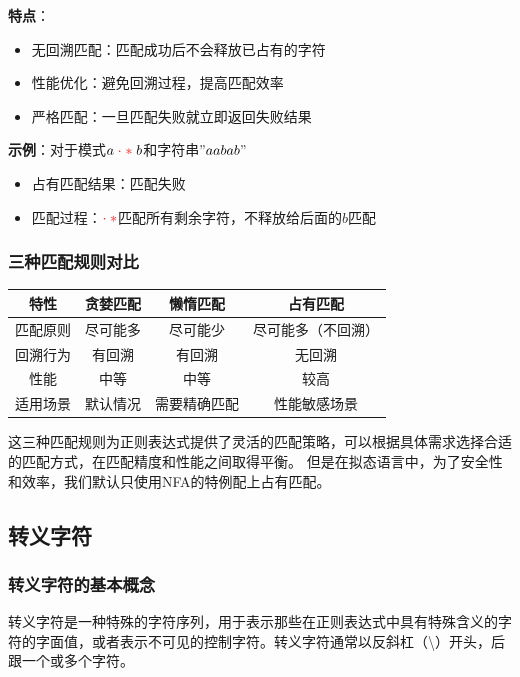 \documentclass[12pt,a4paper,UTF8]{ctexart}
\newcommand{\func}[1]{\textcolor{red}{#1}}
\begin{document}
\textbf{特点}：
\begin{itemize}
    \item 无回溯匹配：匹配成功后不会释放已占有的字符
    \item 性能优化：避免回溯过程，提高匹配效率
    \item 严格匹配：一旦匹配失败就立即返回失败结果
\end{itemize}

\textbf{示例}：对于模式$a\;\func{\cdot\;*}\;b$和字符串$"aabab"$
\begin{itemize}
    \item 占有匹配结果：匹配失败
    \item 匹配过程：$\func{\cdot\;*}$匹配所有剩余字符，不释放给后面的$b$匹配
\end{itemize}

\subsubsection{三种匹配规则对比}

\begin{center}
\begin{tabular}{|c|c|c|c|}
\hline
\textbf{特性} & \textbf{贪婪匹配} & \textbf{懒惰匹配} & \textbf{占有匹配} \\
\hline
匹配原则 & 尽可能多 & 尽可能少 & 尽可能多（不回溯） \\
\hline
回溯行为 & 有回溯 & 有回溯 & 无回溯 \\
\hline
性能 & 中等 & 中等 & 较高 \\
\hline
适用场景 & 默认情况 & 需要精确匹配 & 性能敏感场景 \\
\hline
\end{tabular}
\end{center}

\qquad 这三种匹配规则为正则表达式提供了灵活的匹配策略，可以根据具体需求选择合适的匹配方式，在匹配精度和性能之间取得平衡。
但是在拟态语言中，为了安全性和效率，我们默认只使用NFA的特例配上占有匹配。

\subsection{转义字符}

\subsubsection{转义字符的基本概念}

\qquad 转义字符是一种特殊的字符序列，用于表示那些在正则表达式中具有特殊含义的字符的字面值，或者表示不可见的控制字符。转义字符通常以反斜杠（\textbackslash）开头，后跟一个或多个字符。
\end{document}
